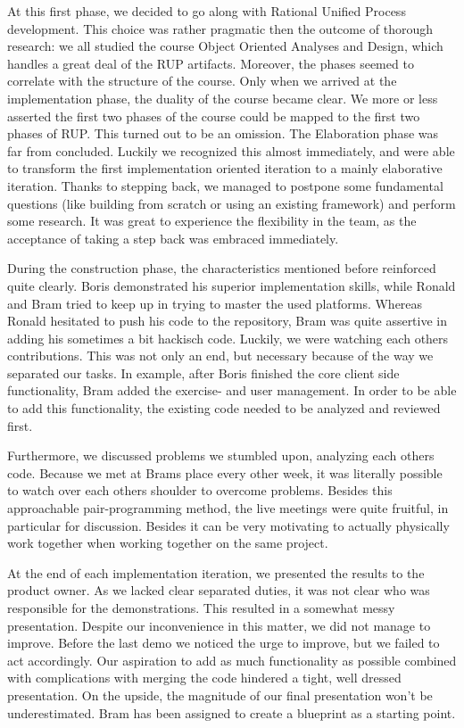 At this first phase, we decided to go along with Rational Unified Process
development. This choice was rather pragmatic then the outcome of thorough
research: we all studied the course Object Oriented Analyses and Design, which
handles a great deal of the RUP artifacts. Moreover, the phases seemed to 
correlate with the structure of the course. Only when we arrived at the 
implementation phase, the duality of the course became clear. We more or less
asserted the first two phases of the course could be mapped to the first two
phases of RUP. This turned out to be an omission. The Elaboration phase was far
from concluded. Luckily we recognized this almost immediately, and were able
to transform the first implementation oriented iteration to a mainly 
elaborative iteration. Thanks to stepping back, we managed to postpone some
fundamental questions (like building from scratch or using an existing
framework) and perform some research. It was great to experience the
flexibility in the team, as the acceptance of taking a step back was
embraced immediately. 

During the construction phase, the characteristics mentioned before reinforced
quite clearly. Boris demonstrated his superior implementation skills, 
while Ronald and Bram tried to keep up in trying to master the used platforms. 
Whereas Ronald hesitated to push his code to the repository, Bram was quite 
assertive in adding his sometimes a bit hackisch code. Luckily, we were watching 
each others contributions. This was not only an end, but necessary because of
the way we separated our tasks. In example, after Boris finished the core client
side functionality, Bram added the exercise- and user management. In order to be
able to add this functionality, the existing code needed to be analyzed and
reviewed first.

Furthermore, we discussed problems we stumbled upon, analyzing each others code.
Because we met at Brams place every other week, it was literally possible to
watch over each others shoulder to overcome problems. Besides this approachable
pair-programming method, the live meetings were quite fruitful, in particular
for discussion. Besides it can be very motivating to actually physically work
together when working together on the same project. 

At the end of each implementation iteration, we presented the results to the product
owner. As we lacked clear separated duties, it was not clear who was responsible 
for the demonstrations. This resulted in a somewhat messy presentation. Despite
our inconvenience in this matter, we did not manage to improve. Before 
the last demo we noticed the urge to improve, but we failed to act
accordingly. Our aspiration to add as much functionality as possible combined
with complications with merging the code hindered a tight, well dressed
presentation. On the upside, the magnitude of our final presentation won't be
underestimated. Bram has been assigned to create a blueprint as a starting
point.

